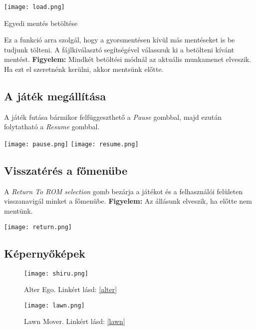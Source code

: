 \begin{center}
	\texttt{[image: load.png]}
\end{center}


\begin{subsubsection}{Egyedi mentés betöltése}

Ez a funkció arra szolgál, hogy a gyorsmentésen kívül más mentéseket is be tudjunk tölteni. A fájlkiválasztó segítségével válasszuk ki a betölteni kívánt mentést. \newline \textbf{Figyelem:} Mindkét betöltési módnál az aktuális munkamenet elveszik. Ha ezt el szeretnénk kerülni, akkor mentsünk előtte.

\end{subsubsection}

\subsection{A játék megállítása}

A játék futása bármikor felfüggeszthető a \emph{Pause} gombbal, majd ezután folytatható a \emph{Resume} gombbal.

\begin{center}
	\texttt{[image: pause.png]}
	\qquad
	\texttt{[image: resume.png]}
\end{center}

\subsection{Visszatérés a főmenübe}
A \emph{Return To ROM selection} gomb bezárja a játékot és a felhasználói felületen visszanavigál minket a főmenübe.
\newline \textbf{Figyelem:} Az állásunk elveszik, ha előtte nem mentünk. 
\vspace{0.3cm}
\begin{center}
	\texttt{[image: return.png]}
\end{center}

\subsection{Képernyőképek}
\begin{figure}[H]
	\centering
	\texttt{[image: shiru.png]}
	\caption[Alter Ego]{Alter Ego. Linkért lásd: \ref{alter}}
	\vspace{1cm}
	\texttt{[image: lawn.png]}
	\caption[Lawn Mover]{Lawn Mover. Linkért lásd: \ref{lawn}}
\end{figure}